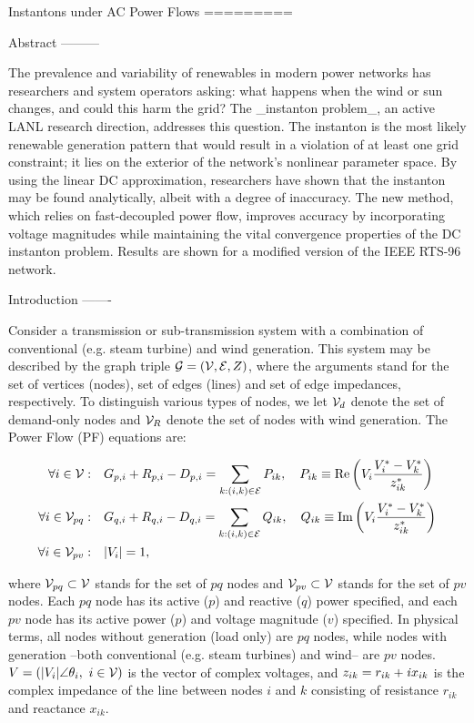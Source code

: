 Instantons under AC Power Flows
=========

Abstract
---------

The prevalence and variability of renewables in modern power networks has researchers and system operators asking: what happens when the wind or sun changes, and could this harm the grid? The _instanton problem_, an active LANL research direction, addresses this question. The instanton is the most likely renewable generation pattern that would result in a violation of at least one grid constraint; it lies on the exterior of the network's nonlinear parameter space. By using the linear DC approximation, researchers have shown that the instanton may be found analytically, albeit with a degree of inaccuracy. The new method, which relies on fast-decoupled power flow, improves accuracy by incorporating voltage magnitudes while maintaining the vital convergence properties of the DC instanton problem. Results are shown for a modified version of the IEEE RTS-96 network.

Introduction
-------

Consider a transmission or sub-transmission system with a combination of conventional (e.g. steam turbine) and wind generation. This system may be described by the graph triple ${\cal G}=({\cal V},{\cal E},{Z})$, where the arguments stand for the set of vertices (nodes), set of edges (lines) and set of edge impedances, respectively. To distinguish various types of nodes, we let ${\cal V}_d$ denote the set of demand-only nodes and ${\cal V}_R$ denote the set of nodes with wind generation. The Power Flow (PF) equations are:

$$\begin{align}
\forall i\in{\cal V}:&\quad G_{p,i} + R_{p,i} - D_{p,i} = \sum_{k:(i,k)\in{\cal E}} P_{ik},\quad
P_{ik}\equiv
\mbox{Re}\left(V_i\frac{V_i^*-V_k^*}{z_{ik}^*}\right) \\
\forall i\in{\cal V}_{pq}:&\quad G_{q,i} + R_{q,i} - D_{q,i} =\sum_{k:(i,k)\in{\cal E}} Q_{ik},\quad Q_{ik}\equiv\mbox{Im}\left(V_i\frac{V_i^*-V_k^*}{z_{ik}^*}\right) \\
\forall i\in{\cal V}_{pv}:&\quad |V_i|=1,
\end{align}$$

where ${\cal V}_{pq}\subset {\cal V}$ stands for the set of $pq$ nodes and ${\cal V}_{pv}\subset {\cal V}$ stands for the set of $pv$ nodes. Each $pq$ node has its active ($p$) and reactive ($q$) power specified, and each $pv$ node has its active power ($p$) and voltage magnitude ($v$) specified. In physical terms, all nodes without generation (load only) are $pq$ nodes, while nodes with generation --both conventional (e.g. steam turbines) and wind-- are $pv$ nodes. $V=(|V_i|\angle \theta_i,~i\in{\cal V})$ is the vector of complex voltages, and $z_{ik} = r_{ik}+{\it i} x_{ik}$ is the complex impedance of the line between nodes $i$ and $k$ consisting of resistance $r_{ik}$ and reactance $x_{ik}$.

